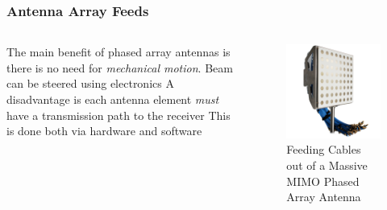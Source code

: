 \documentclass[10pt]{beamer}
\begin{document}
\begin{frame}
    \frametitle{Antenna Array Feeds}
    \begin{columns}[] %
        \begin{column}{.6\textwidth}
            \begin{outline}
                \1 The main benefit of phased array antennas is there is no need for \textit{mechanical motion}.
                \2 Beam can be steered using electronics
                \1 A disadvantage is each antenna element \textit{must} have a transmission path to the receiver
                \2 This is done both via hardware and software
            \end{outline}   
        \end{column}
        \begin{column}{.4\textwidth}
            \begin{figure}[h!]
                \centering
                \includegraphics[width=.8\textwidth]{CMM.100.A_01.png}
                \caption{Feeding Cables out of a Massive MIMO Phased Array Antenna}
            \end{figure}

        \end{column}%
    \end{columns}
\end{frame}
\end{document}
